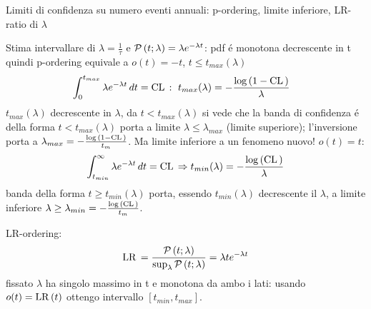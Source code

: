 \documentclass[asd-beamer.tex]{subfiles}
\begin{document}
\begin{frame}{Limiti di confidenza su numero eventi annuali: p-ordering, limite inferiore, LR-ratio di $\lambda$}

Stima intervallare di $\lambda=\frac{1}{\tau}$ e $\operatorname{\mathcal{P}}{(t;\lambda)}=\lambda e^{-\lambda t}$: pdf \'e monotona decrescente in t quindi p-ordering equivale a $o(t)=-t$, $t\leq t_{max}(\lambda)$
\begin{align*}
&\int_0^{t_{max}}\lambda\exp{-\lambda t}\,dt=\cl{}:\ t_{max}(\lambda)=-\frac{\log{(1-\cl{})}}{\lambda}
\end{align*}
$t_{max}(\lambda)$ decrescente in $\lambda$, da $t<t_{max}(\lambda)$ si vede che la banda di confidenza \'e della forma $t<t_{max}(\lambda)$ porta a limite $\lambda\leq\lambda_{max}$ (limite superiore); l'inversione porta a $\lambda_{max}=-\frac{\log{(1-\operatorname{CL}{})}}{t_m}$.
Ma limite inferiore a un fenomeno nuovo! $o(t)=t$:
\begin{equation*}
\int_{t_{min}}^{\infty}\lambda e^{-\lambda t}\,dt=\operatorname{CL}{}\Rightarrow t_{min}(\lambda)=-\frac{\log{(\operatorname{CL}{})}}{\lambda}
\end{equation*}
banda della forma $t\geq t_{min}(\lambda)$ porta, essendo $t_{min}(\lambda)$ decrescente il $\lambda$, a limite inferiore $\lambda\geq\lambda_{min}=-\frac{\log{(\operatorname{CL}{})}}{t_m}$. 

LR-ordering:
\begin{equation*}
\operatorname{LR}{}=\frac{\operatorname{\mathcal{P}}{(t;\lambda)}}{\sup_{\lambda}\operatorname{\mathcal{P}}{(t;\lambda)}}=\lambda te^{-\lambda t}
\end{equation*}
fissato $\lambda$ ha singolo massimo in t e monotona da ambo i lati: usando $o(t)=\operatorname{LR}{(t)}$ ottengo intervallo $[t_{min},t_{max}]$.
\end{frame}
\end{document}
